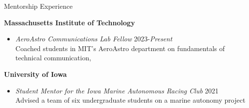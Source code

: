 \begin{rSection}{Mentorship Experience}\
    
    \textbf{Massachusetts Institute of Technology}
    \begin{itemize}
        \item \textit{AeroAstro Communications Lab Fellow} \hfill 2023-\textit{Present}\\
        Coached students in MIT's AeroAstro department on fundamentals of technical communication, 
    \end{itemize}
    

    \textbf{University of Iowa}
    \begin{itemize}
        \item \textit{Student Mentor for the Iowa Marine Autonomous Racing Club} \hfill 2021\\
        Advised a team of six undergraduate students on a marine autonomy project
    \end{itemize}
    


\end{rSection}